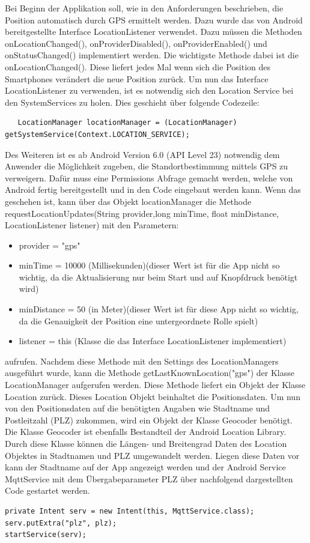 Bei Beginn der Applikation soll, wie in den Anforderungen beschrieben, die Position automatisch durch GPS ermittelt werden. Dazu wurde das von Android bereitgestellte Interface LocationListener verwendet. Dazu müssen die Methoden onLocationChanged(), onProviderDisabled(), onProviderEnabled() und onStatusChanged() implementiert werden. 
Die wichtigste Methode dabei ist die onLocationChanged(). Diese liefert jedes Mal wenn sich die Position des Smartphones verändert die neue Position zurück. 
Um nun das Interface LocationListener zu verwenden, ist es notwendig sich den Location Service bei den SystemServices zu holen. Dies geschieht über folgende Codezeile:
  \begin{lstlisting}
   LocationManager locationManager = (LocationManager) getSystemService(Context.LOCATION_SERVICE);
  \end{lstlisting}
  Des Weiteren ist es ab Android Version 6.0 (API Level 23) notwendig dem Anwender die Möglichkeit zugeben, die Standortbestimmung mittels GPS zu verweigern. Dafür muss eine Permissions Abfrage gemacht werden, welche von Android fertig bereitgestellt und in den Code eingebaut werden kann. Wenn das geschehen ist, kann über das Objekt locationManager die Methode requestLocationUpdates(String provider,long minTime, float minDistance, LocationListener listener) mit den Parametern: 
    \begin{itemize}
\item provider = "gps"
\item minTime = 10000 (Millisekunden)(dieser Wert ist für die App nicht so wichtig, da die Aktualisierung nur beim Start und auf Knopfdruck benötigt wird)
\item minDistance = 50 (in Meter)(dieser Wert ist für diese App nicht so wichtig, da die Genauigkeit der Position eine untergeordnete Rolle spielt)
\item listener = this (Klasse die das Interface LocationListener implementiert)
\end{itemize}  
aufrufen. Nachdem diese Methode mit den Settings des LocationManagers ausgeführt wurde, kann die Methode getLastKnownLocation("gps") der Klasse LocationManager aufgerufen werden. Diese Methode liefert ein Objekt der Klasse Location zurück. Dieses Location Objekt beinhaltet die Positionsdaten. Um nun von den Positionsdaten auf die benötigten Angaben wie Stadtname und Postleitzahl (PLZ) zukommen, wird ein Objekt der Klasse Geocoder benötigt. Die Klasse Geocoder ist ebenfalls Bestandteil der Android Location Library. Durch diese Klasse können die Längen- und Breitengrad Daten des Location Objektes in Stadtnamen und PLZ umgewandelt werden.
Liegen diese Daten vor kann der Stadtname auf der App angezeigt werden und der Android Service MqttService mit dem Übergabeparameter PLZ über nachfolgend dargestellten Code gestartet werden.
 \begin{lstlisting}
private Intent serv = new Intent(this, MqttService.class);
serv.putExtra("plz", plz); 
startService(serv);
  \end{lstlisting}

